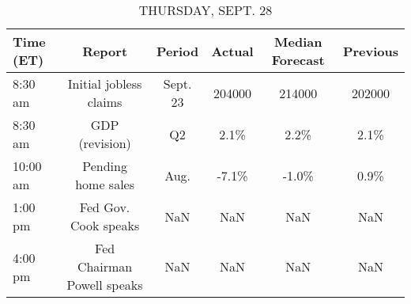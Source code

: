 \documentclass{article}%
\begin{document}
%


\begin{table}[htbp]%
\caption{THURSDAY, SEPT. 28}%
\centering%
\begin{adjustbox}{width=1\textwidth}%
\begin{tabular}{lccccc}
\toprule
Time (ET) &                     Report &   Period & Actual & Median Forecast & Previous \\
\midrule
  8:30 am &     Initial jobless claims & Sept. 23 & 204000 &          214000 &   202000 \\
  8:30 am &             GDP (revision) &       Q2 &   2.1\% &            2.2\% &     2.1\% \\
 10:00 am &         Pending home sales &     Aug. &  -7.1\% &           -1.0\% &     0.9\% \\
  1:00 pm &       Fed Gov. Cook speaks &      NaN &    NaN &             NaN &      NaN \\
  4:00 pm & Fed Chairman Powell speaks &      NaN &    NaN &             NaN &      NaN \\
\bottomrule
\end{tabular}
%
\end{adjustbox}%
\end{table}

%
\end{document}
